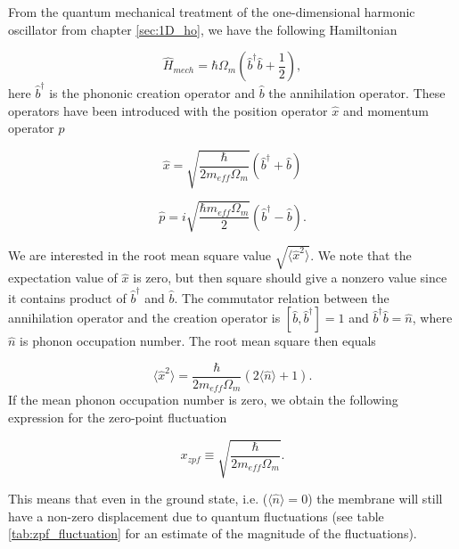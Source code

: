 From the quantum mechanical treatment of the one-dimensional harmonic oscillator from chapter \ref{sec:1D_ho}, we have the following Hamiltonian \cite{aspelmeyer2014, griffiths2005}

\begin{equation}
\hat{H}_{mech} = \hbar\Omega_{m}\left(\hat{b}^{\dagger}\hat{b} + \frac{1}{2}\right),
\label{eq:ham_mech}
\end{equation}
\noindent
here $\hat{b}^{\dagger}$ is the phononic creation operator and $\hat{b}$ the annihilation operator. These operators have been introduced with the position operator $\hat{x}$ and momentum operator $\hat{p}$

\begin{equation}
\hat{x} = \sqrt{\frac{\hbar}{2m_{eff}\Omega_{m}}}(\hat{b}^{\dagger} + \hat{b})
\label{eq:qm_pos}
\end{equation}

\begin{equation}
\hat{p} = i\sqrt{\frac{\hbar m_{eff}\Omega_{m}}{2}}(\hat{b}^{\dagger} - \hat{b}).
\label{eq:qm_mom}
\end{equation}


We are interested in the root mean square value $\sqrt{\langle \hat{x}^2 \rangle}$. We note that the expectation value of $\hat{x}$ is zero, but then square should give a nonzero value since it contains product of $\hat{b}^{\dagger}$ and $\hat{b}$. The commutator relation between the annihilation operator and the creation operator is $\left[ \hat{b}, \hat{b}^{\dagger} \right] = 1$ and $\hat{b}^{\dagger}\hat{b} = \hat{n}$, where $\hat{n}$ is phonon occupation number. The root mean square then equals

\begin{equation}
\langle \hat{x}^2 \rangle = \frac{\hbar}{2m_{eff}\Omega_{m}}(2\langle\hat{n}\rangle + 1).
\label{eq:pos_fluc}
\end{equation}
\noindent
If the mean phonon occupation number is zero, we obtain the following expression for the zero-point fluctuation

\begin{equation}
x_{zpf} \equiv \sqrt{\frac{\hbar}{2m_{eff}\Omega_{m}}}.
\label{eq:xzpf}
\end{equation}

This means that even in the ground state, i.e. ($\langle \hat{n} \rangle = 0$) the membrane will still have a non-zero displacement due to quantum fluctuations (see table \ref{tab:zpf_fluctuation} for an estimate of the magnitude of the fluctuations).

